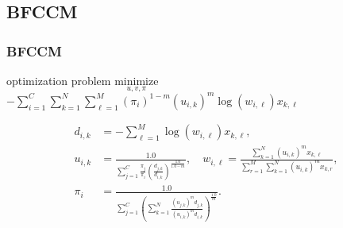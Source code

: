 \documentclass[fleqn,dvipdfmx,10pt]{beamer}
\begin{document}
\subsection{BFCCM}
\begin{frame}\frametitle{BFCCM}
  \begin{block}{optimization problem}
    $\underset{u,v,\pi}{\text{minimize}}$
    $-\sum_{i=1}^C\sum_{k=1}^N\sum_{\ell=1}^M(\pi_i)^{1-m}(u_{i,k})^m \log{(w_{i,\ell})}x_{k,\ell}$
  \end{block}
  \begin{center}
    \begin{align*}
      d_{i,k}&=-\sum_{\ell=1}^M\log(w_{i,\ell})x_{k,\ell},\\
      u_{i,k}&=\frac{1.0}{\sum_{j=1}^C\frac{\pi_{j}}{\pi_{i}}\left(\frac{d_{j,k}}{d_{i,k}}\right)^\frac{1.0}{1.0-{m}}},\quad
      w_{i,\ell}=\frac{\sum_{k=1}^N (u_{i,k})^m x_{k,\ell}}{\sum_{r=1}^M \sum_{k=1}^N (u_{i,k})^m x_{k,r}},\\
      \pi_{i}&=\frac{1.0}{\sum_{j=1}^C\left(\sum_{k=1}^N\frac{(u_{j,k})^{m}d_{j,k}}{(u_{i,k})^{m}d_{i,k}}\right)^{\frac{1.0}{m}}}.\\
    \end{align*}
  \end{center}
\end{frame}
\end{document}
